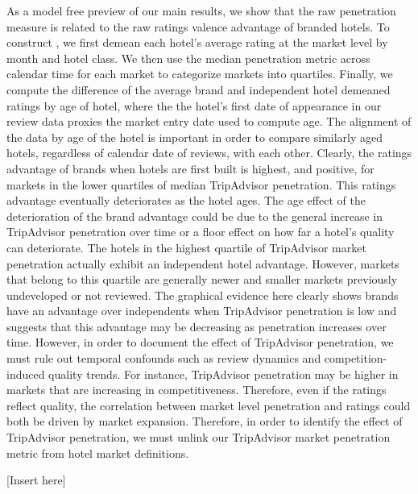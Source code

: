 \documentclass[mksc,blindrev]{informs3} %
\begin{document}
As a model free preview of our main results, we show that the raw penetration measure is related to the raw ratings valence advantage of branded hotels. To construct , we first demean each hotel's average rating at the market level by month and hotel class. We then use the median penetration metric across calendar time for each market to categorize markets into quartiles. Finally, we compute the difference of the average brand and independent hotel demeaned ratings by age of hotel, where the the hotel's first date of appearance in our review data proxies the market entry date used to compute age. The alignment of the data by age of the hotel is important in order to compare similarly aged hotels, regardless of calendar date of reviews, with each other. Clearly, the ratings advantage of brands when hotels are first built is highest, and positive, for markets in the lower quartiles of median TripAdvisor penetration. This ratings advantage eventually deteriorates as the hotel ages. The age effect of the deterioration of the brand advantage could be due to the general increase in TripAdvisor penetration over time or a floor effect on how far a hotel's quality can deteriorate. The hotels in the highest quartile of TripAdvisor market penetration actually exhibit an independent hotel advantage. However, markets that belong to this quartile are generally newer and smaller markets previously undeveloped or not reviewed. The graphical evidence here clearly shows brands have an advantage over independents when TripAdvisor penetration is low and suggests that this advantage may be decreasing as penetration increases over time. However, in order to document the effect of TripAdvisor penetration, we must rule out temporal confounds such as review dynamics and competition-induced quality trends. For instance, TripAdvisor penetration may be higher in markets that are increasing in competitiveness. Therefore, even if the ratings reflect quality, the correlation between market level penetration and ratings could both be driven by market expansion. Therefore, in order to identify the effect of TripAdvisor penetration, we must unlink our TripAdvisor market penetration metric from hotel market definitions.

[Insert  here]


\end{document}
